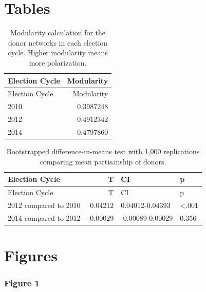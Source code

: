 \documentclass[12pt,]{article}
\begin{document}
\newpage

\hypertarget{tables}{%
\section{Tables}\label{tables}}

\begin{longtable}[]{@{}lr@{}}
\caption{Modularity calculation for the donor networks in each election
cycle. Higher modularity means more polarization.}\tabularnewline
\toprule
Election Cycle & Modularity\tabularnewline
\midrule
\endfirsthead
\toprule
Election Cycle & Modularity\tabularnewline
\midrule
\endhead
2010 & 0.3987248\tabularnewline
2012 & 0.4912342\tabularnewline
2014 & 0.4797860\tabularnewline
\bottomrule
\end{longtable}

\newpage

\begin{longtable}[]{@{}lrll@{}}
\caption{Bootstrapped difference-in-means test with 1,000 replications
comparing mean partisanship of donors.}\tabularnewline
\toprule
Election Cycle & T & CI & p\tabularnewline
\midrule
\endfirsthead
\toprule
Election Cycle & T & CI & p\tabularnewline
\midrule
\endhead
2012 compared to 2010 & 0.04212 & 0.04012-0.04393 &
\textless.001\tabularnewline
2014 compared to 2012 & -0.00029 & -0.00089-0.00029 &
0.356\tabularnewline
\bottomrule
\end{longtable}

\newpage

\hypertarget{figures}{%
\section{Figures}\label{figures}}

\hypertarget{figure-1}{%
\subsubsection{Figure 1}\label{figure-1}}
\end{document}
